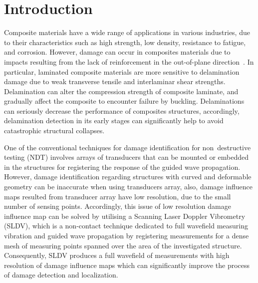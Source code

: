 \documentclass[preprint,9pt]{elsarticle}
\begin{document}
	\section{Introduction}
	Composite materials have a wide range of applications in various industries, due to their characteristics such as high strength, low density, resistance to fatigue, and corrosion.  
	However, damage can occur in composites materials due to impacts resulting from the lack of reinforcement in the out-of-plane direction~\cite{Francesconi2019}.
	In particular, laminated composite materials are more sensitive to delamination damage due to weak transverse tensile and interlaminar shear strengths.
	Delamination can alter the compression strength of composite laminate, and gradually affect the composite to encounter failure by buckling. 
	Delaminations can seriously decrease the performance of composites structures, accordingly, delamination detection in its early stages can significantly help to avoid catastrophic structural collapses.
	
	One of the conventional techniques for damage identification for non~destructive testing (NDT) involves arrays of transducers that can be mounted or embedded in the structures for registering the response of the guided wave propagation.
	However, damage identification regarding structures with curved and deformable geometry can be inaccurate when using transducers array, also, damage influence maps resulted from transducer array have low resolution, due to the small number of sensing points. 
    Accordingly, this issue of low resolution damage influence map can be solved by utilising a Scanning Laser Doppler Vibrometry (SLDV), which is a non-contact technique dedicated to full wavefield measuring vibration and guided wave propagation by registering measurements for a dense mesh of measuring points spanned over the area of the investigated structure.
    Consequently, SLDV produces a full wavefield of measurements with high resolution of damage influence maps which can significantly improve the process of damage detection and localization. 
    
\end{document}
